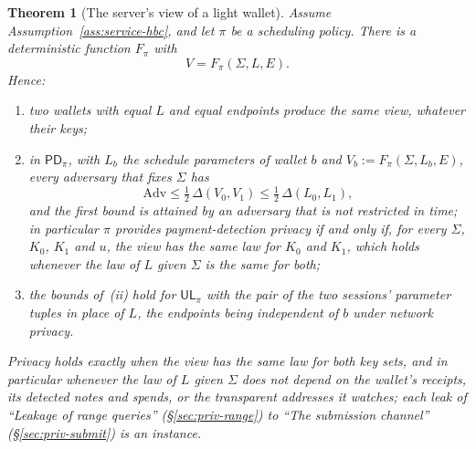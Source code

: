 \documentclass[11pt,a4paper]{article}
\newtheorem{theorem}{Theorem}[section]
\theoremstyle{definition}
\begin{document}
\begin{theorem}[The server's view of a light wallet]\label{thm:priv-view}
Assume Assumption~\ref{ass:service-hbc}, and let $\pi$ be a scheduling
policy. There is a deterministic function $F_\pi$ with
\[
  V = F_\pi(\Sigma, L, E).
\]
Hence:
\begin{enumerate}[label=(\roman*)]
\item two wallets with equal $L$ and equal endpoints produce the same view,
  whatever their keys;
\item in $\mathsf{PD}_\pi$, with $L_b$ the schedule parameters of wallet
  $b$ and $V_b := F_\pi(\Sigma, L_b, E)$, every adversary that fixes
  $\Sigma$ has
  \[
    \mathrm{Adv} \le \tfrac12\, \Delta(V_0, V_1)
      \le \tfrac12\, \Delta(L_0, L_1),
  \]
  and the first bound is attained by an adversary that is not restricted
  in time; in particular $\pi$ provides payment-detection privacy if and
  only if, for every $\Sigma$, $K_0$, $K_1$ and $u$, the view has the same
  law for $K_0$ and $K_1$, which holds whenever the law of $L$ given
  $\Sigma$ is the same for both;
\item the bounds of~(ii) hold for $\mathsf{UL}_\pi$ with the pair of the
  two sessions' parameter tuples in place of $L$, the endpoints being
  independent of $b$ under network privacy.
\end{enumerate}
Privacy holds exactly when the view has the same law for both key sets,
and in particular whenever the law of $L$ given $\Sigma$ does not depend on
the wallet's receipts, its detected notes and spends, or the transparent
addresses it watches; each leak of ``Leakage of range queries''
(\S\ref{sec:priv-range}) to ``The submission channel''
(\S\ref{sec:priv-submit}) is an instance.
\end{theorem}
\end{document}
